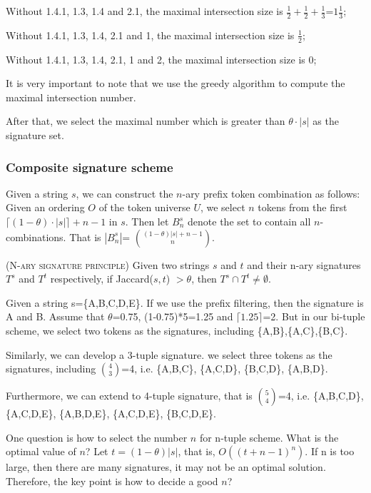 Without 1.4.1, 1.3, 1.4 and 2.1, the maximal intersection size is $\frac{1}{2}+\frac{1}{2}+\frac{1}{3}$=$1\frac{1}{3}$;

Without 1.4.1, 1.3, 1.4, 2.1 and 1, the maximal intersection size is $\frac{1}{2}$;

Without 1.4.1, 1.3, 1.4, 2.1, 1 and 2, the maximal intersection size is $0$;

It is very important to note that we use the greedy algorithm to compute the maximal intersection number.

After that, we select the maximal number which is greater than $\theta \cdot |s|$ as the signature set.

\subsubsection{Composite signature scheme}




Given a string $s$, we can construct the $n$-ary prefix token combination as follows:  Given an
ordering $O$ of the token universe $U$, we select $n$ tokens from the first $\lceil (1-
\theta) \cdot |s| \rceil + n -1$ in $s$. Then let $B^s_n$ denote the set to contain all $n$-combinations. That is  $|B^s_n|$= $\binom{(1-\theta)|s|+n-1}{n}$.

\begin{lem} (\textsc{N-ary signature principle}) Given two strings $s$ and $t$ and their n-ary signatures $T^s$ and $T^t$ respectively, if Jaccard($s, t$) $> \theta$, then $T^s \cap T^t \neq \emptyset$.
\end{lem}

Given a string s=\{A,B,C,D,E\}. If we use the prefix filtering, then the signature is A and B. Assume that $\theta$=0.75, (1-0.75)*5=1.25 and $\lceil 1.25 \rceil$=2. But in our bi-tuple scheme, we select two tokens as the signatures, including \{A,B\},\{A,C\},\{B,C\}.

Similarly, we can develop a 3-tuple signature. we select three tokens as the signatures, including $\binom{4}{3}$=4, i.e. \{A,B,C\}, \{A,C,D\}, \{B,C,D\}, \{A,B,D\}.

Furthermore, we can extend to 4-tuple signature, that is $\binom{5}{4}$=4, i.e. \{A,B,C,D\}, \{A,C,D,E\}, \{A,B,D,E\}, \{A,C,D,E\}, \{B,C,D,E\}.

One question is how to select the number $n$ for n-tuple scheme. What is the optimal value of $n$? Let $t= (1-\theta)|s|$, that is, $O((t+n-1)^{n})$. If n is too large, then there are many signatures, it may not be an optimal solution. Therefore, the key point is how to decide a good $n$?


